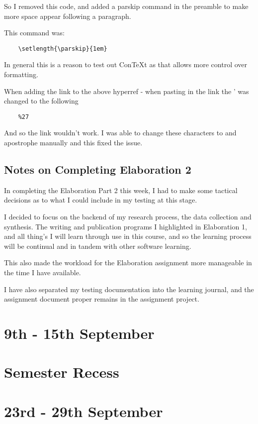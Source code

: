 \documentclass{article}
\begin{document}
So I removed this code, and added a parskip command in the preamble to make more space appear following a paragraph.

This command was:
\begin{verbatim}
    \setlength{\parskip}{1em}
\end{verbatim}

In general this is a reason to test out ConTeXt as that allows more control over formatting. 

\label{Error: copying links to Overleaf}
When adding the link to the above hyperref - when pasting in the link the ' was changed to the following
\begin{verbatim}
    %27
\end{verbatim}

And so the link wouldn't work. I was able to change these characters to and apostrophe manually and this fixed the issue.

\subsection{Notes on Completing Elaboration 2}
In completing the Elaboration Part 2 this week, I had to make some tactical decisions as to what I could include in my testing at this stage. 

I decided to focus on the backend of my research process, the data collection and synthesis. 
The writing and publication programs I highlighted in Elaboration 1, and all thing's I will learn through use in this course, and so the learning process will be continual and in tandem with other software learning. 

This also made the workload for the Elaboration assignment more manageable in the time I have available.

I have also separated my testing documentation into the learning journal, and the assignment document proper remains in the assignment project.

\section{9th - 15th September}

\section*{Semester Recess}

\section{23rd - 29th September}
\end{document}
